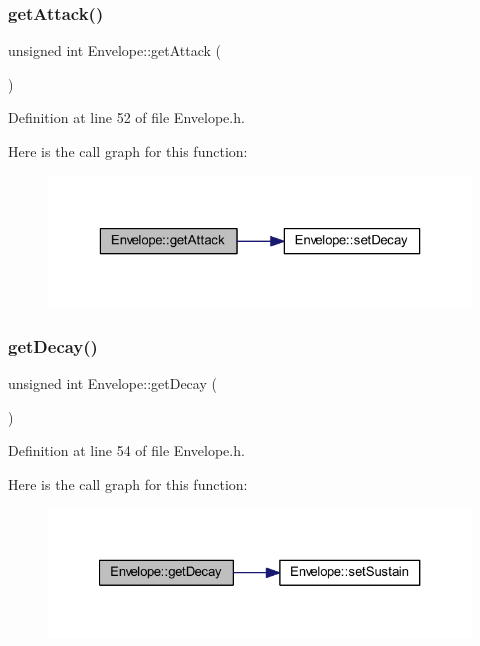 \subsubsection{\texorpdfstring{get\+Attack()}{getAttack()}}
{\footnotesize\ttfamily unsigned int Envelope\+::get\+Attack (\begin{DoxyParamCaption}{ }\end{DoxyParamCaption})\hspace{0.3cm}{\ttfamily [inline]}}



Definition at line 52 of file Envelope.\+h.

Here is the call graph for this function\+:
\nopagebreak
\begin{figure}[H]
\begin{center}
\leavevmode
\includegraphics[width=323pt]{class_envelope_ac1cf99747551ea56b1202844da4fddde_cgraph}
\end{center}
\end{figure}
\mbox{\label{class_envelope_a6c7ba1a801512bb26e0b8114edb10544}} 
\subsubsection{\texorpdfstring{get\+Decay()}{getDecay()}}
{\footnotesize\ttfamily unsigned int Envelope\+::get\+Decay (\begin{DoxyParamCaption}{ }\end{DoxyParamCaption})\hspace{0.3cm}{\ttfamily [inline]}}



Definition at line 54 of file Envelope.\+h.

Here is the call graph for this function\+:
\nopagebreak
\begin{figure}[H]
\begin{center}
\leavevmode
\includegraphics[width=327pt]{class_envelope_a6c7ba1a801512bb26e0b8114edb10544_cgraph}
\end{center}
\end{figure}
\mbox{\label{class_envelope_a84eaf76b6ef7fbd2d394fba1f59cb909}} 
